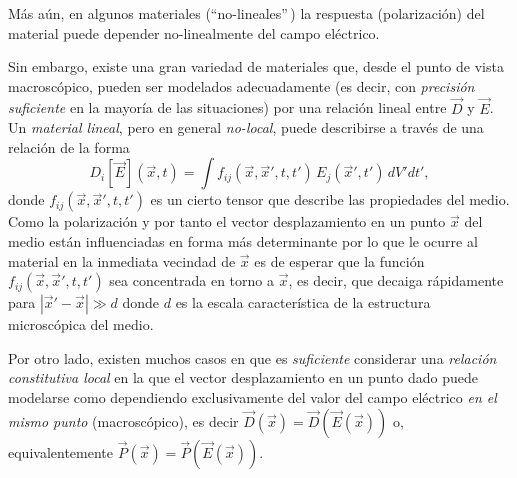 Más aún, en algunos materiales (``no-lineales''\,) la respuesta
(polarización) del material puede depender no-linealmente del campo eléctrico.

Sin embargo, existe una gran variedad de materiales que, desde el punto de
vista macroscópico, pueden ser modelados adecuadamente (es decir, con \textit{precisión suficiente} en la mayoría de las situaciones) por una relación lineal entre $\vec{D}$ y $\vec{E}$. Un \textit{material lineal}, pero en general \textit{no-local}, puede describirse a
través de una relación de la forma
\begin{equation}
D_i[\vec{E}](\vec{x},t)=\int
f_{ij}(\vec{x},\vec{x}',t,t')\,{E}_j(\vec{x}',t')\,dV' dt',
\end{equation}
donde $f_{ij}(\vec{x},\vec{x}',t,t')$ es un cierto tensor que describe las
propiedades del medio. Como la polarización y por tanto el vector
desplazamiento en un punto $\vec{x}$ del medio están influenciadas en forma
más determinante por lo que le ocurre al material en la inmediata vecindad de
$\vec{x}$ es de esperar que la función $f_{ij}(\vec{x},\vec{x}',t,t')$ sea
concentrada en torno a $\vec{x}$, es decir, que decaiga rápidamente para
$|\vec{x}'-\vec{x}|\gg d$ donde $d$ es la escala característica de la
estructura microscópica del medio.

Por otro lado, existen muchos casos en que es \textit{suficiente} considerar una
\textit{relación constitutiva local} en la que el vector desplazamiento en un
punto dado puede modelarse como dependiendo exclusivamente del valor del campo
eléctrico \textit{en el mismo punto} (macroscópico), es decir
$\vec{D}(\vec{x})=\vec{D}(\vec{E}(\vec{x}))$ o, equivalentemente
$\vec{P}(\vec{x})=\vec{P}(\vec{E}(\vec{x}))$.

